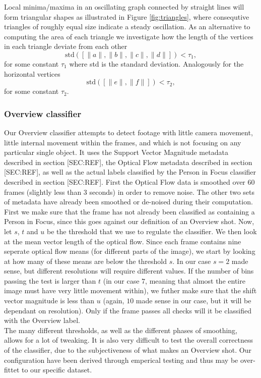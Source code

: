%
Local minima/maxima in an oscillating graph connected by straight lines will form triangular shapes as illustrated in Figure \ref{fig:triangles}, where consequtive triangles of roughly equal size indicate a steady oscillation. As an alternative to computing the area of each triangle we investigate how the length of the vertices in each triangle deviate from each other
\[
\text{std}([\|a\|,\|b\|,\|c\|,\|d\|]) < \tau_1,
\]
for some constant $\tau_1$ where std is the standard deviation. Analogously for the horizontal vertices
\[
\text{std}([\|e\|,\|f\|]) < \tau_2,
\]
for some constant $\tau_2$.
%
\subsubsection{Overview classifier}
%
Our Overview classifier attempts to detect footage with little camera movement, little internal movement within the frames, and which is not focusing on any particular single object.
%
%
It uses the Support Vector Magnitude metadata described in section [SEC:REF], the Optical Flow metadata described in section [SEC:REF], as well as the actual labels classified by the Person in Focus classifier described in section [SEC:REF]. First the Optical Flow data is smoothed over 60 frames (slightly less than 3 seconds) in order to remove noise. The other two sets of metadata have already been smoothed or de-noised during their computation.\\
%
%
First we make sure that the frame has not already been classified as containing a Person in Focus, since this goes against our definition of an Overview shot. Now, let $s$, $t$ and $u$ be the threshold that we use to regulate the classifier. We then look at the mean vector length of the optical flow. Since each frame contains nine seperate optical flow means (for different parts of the image), we start by looking at how many of these means are below the threshold $s$. In our case $s=2$ made sense, but different resolutions will require different values. If the number of bins passing the test is larger than $t$ (in our case $7$, meaning that almost the entire image must have very little movement within), we futher make sure that the shift vector magnitude is less than $u$ (again, $10$ made sense in our case, but it will be dependant on resolution).
%
%
Only if the frame passes all checks will it be classified with the Overview label.\\
The many different thresholds, as well as the different phases of smoothing, allows for a lot of tweaking. It is also very difficult to test the overall correctness of the classifier, due to the subjectiveness of what makes an Overview shot. Our configuration have been derived through emperical testing and thus may be over-fittet to our specific dataset.
%
